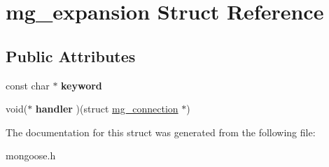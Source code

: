 \hypertarget{structmg__expansion}{\section{mg\-\_\-expansion Struct Reference}
\label{structmg__expansion}
}
\subsection*{Public Attributes}
\begin{DoxyCompactItemize}
\item 
\hypertarget{structmg__expansion_a3cc07d545ce1725a6b2e35d9f3ac0d94}{const char $\ast$ {\bfseries keyword}}\label{structmg__expansion_a3cc07d545ce1725a6b2e35d9f3ac0d94}

\item 
\hypertarget{structmg__expansion_a66ecf4f72da0aaf09513053ce1d4bd47}{void($\ast$ {\bfseries handler} )(struct \hyperlink{structmg__connection}{mg\-\_\-connection} $\ast$)}\label{structmg__expansion_a66ecf4f72da0aaf09513053ce1d4bd47}

\end{DoxyCompactItemize}


The documentation for this struct was generated from the following file\-:\begin{DoxyCompactItemize}
\item 
mongoose.\-h\end{DoxyCompactItemize}
